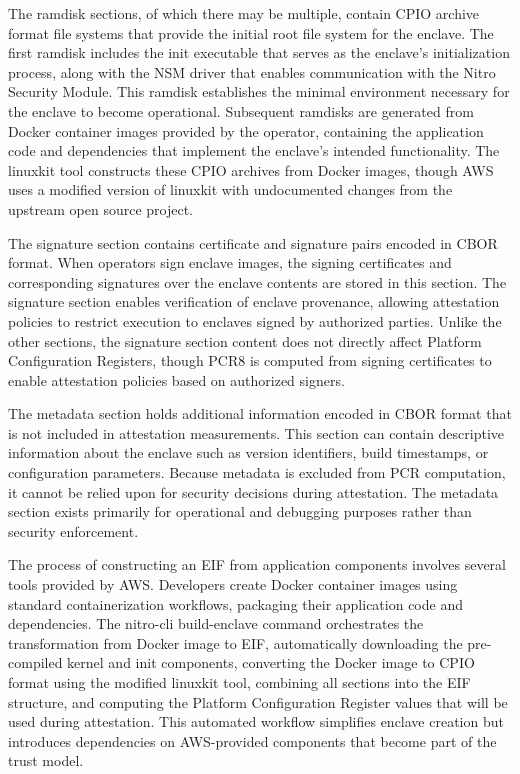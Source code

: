 The ramdisk sections, of which there may be multiple, contain CPIO archive format file systems that provide the initial root file system for the enclave. The first ramdisk includes the init executable that serves as the enclave's initialization process, along with the NSM driver that enables communication with the Nitro Security Module. This ramdisk establishes the minimal environment necessary for the enclave to become operational. Subsequent ramdisks are generated from Docker container images provided by the operator, containing the application code and dependencies that implement the enclave's intended functionality. The linuxkit tool constructs these CPIO archives from Docker images, though AWS uses a modified version of linuxkit with undocumented changes from the upstream open source project.

The signature section contains certificate and signature pairs encoded in CBOR format. When operators sign enclave images, the signing certificates and corresponding signatures over the enclave contents are stored in this section. The signature section enables verification of enclave provenance, allowing attestation policies to restrict execution to enclaves signed by authorized parties. Unlike the other sections, the signature section content does not directly affect Platform Configuration Registers, though PCR8 is computed from signing certificates to enable attestation policies based on authorized signers.

The metadata section holds additional information encoded in CBOR format that is not included in attestation measurements. This section can contain descriptive information about the enclave such as version identifiers, build timestamps, or configuration parameters. Because metadata is excluded from PCR computation, it cannot be relied upon for security decisions during attestation. The metadata section exists primarily for operational and debugging purposes rather than security enforcement.

The process of constructing an EIF from application components involves several tools provided by AWS. Developers create Docker container images using standard containerization workflows, packaging their application code and dependencies. The nitro-cli build-enclave command orchestrates the transformation from Docker image to EIF, automatically downloading the pre-compiled kernel and init components, converting the Docker image to CPIO format using the modified linuxkit tool, combining all sections into the EIF structure, and computing the Platform Configuration Register values that will be used during attestation. This automated workflow simplifies enclave creation but introduces dependencies on AWS-provided components that become part of the trust model.

